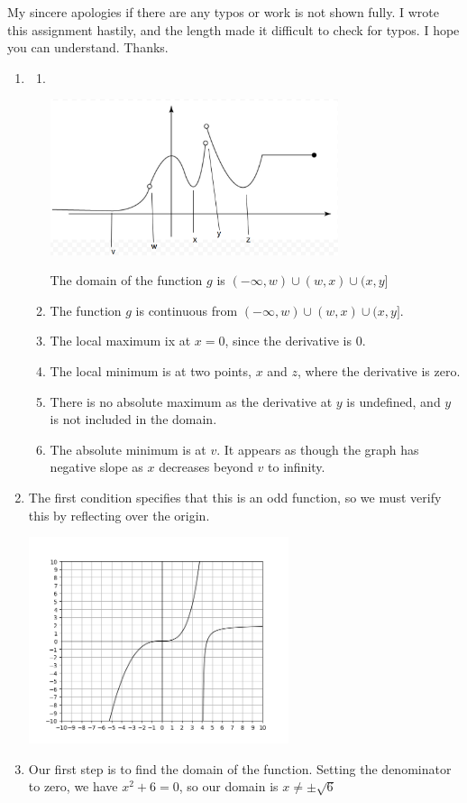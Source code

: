 \documentclass[11pt, letterpaper, twoside]{article}
\begin{document}
\noindent My sincere apologies if there are any typos or work is not shown fully. 
I wrote this assignment hastily, and the length made it difficult to check for typos. 
I hope you can understand. Thanks.
\begin{enumerate}
\item 
\begin{enumerate}[label=\alph*)]
\item ‌‌ 

\vspace{0.2cm}
\includegraphics[width=0.7\textwidth]{q1}\par

The domain of the function \(g\) is \((-\infty, w)\cup(w, x)\cup(x, y]\)
\item The function \(g\) is continuous from \((-\infty, w)\cup(w, x)\cup(x, y]\).
\item The local maximum ix at \(x=0\), since the derivative is 0.
\item The local minimum is at two points, \(x\) and \(z\), where the derivative is zero.
\item There is no absolute maximum as the derivative at \(y\) is undefined, and \(y\) is not included in the domain.
\item The absolute minimum is at \(v\). It appears as though the graph has negative slope as \(x\) decreases beyond \(v\) to infinity.
\end{enumerate}
\item %
The first condition specifies that this is an odd function, so we must verify this by reflecting over the origin.

\includegraphics[width=0.6\textwidth]{q2}\par\vspace{1cm}
\item %
Our first step is to find the domain of the function.
Setting the denominator to zero, we have \(x^2+6=0\), so our domain is \(x\neq\pm\sqrt6\)


\end{enumerate}
\end{document}
